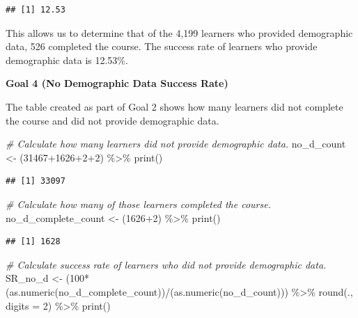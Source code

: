 \documentclass[
]{article}
\newenvironment{Shaded}{\begin{snugshade}}{\end{snugshade}}
\newcommand{\AttributeTok}[1]{\textcolor[rgb]{0.77,0.63,0.00}{#1}}
\newcommand{\CommentTok}[1]{\textcolor[rgb]{0.56,0.35,0.01}{\textit{#1}}}
\newcommand{\DecValTok}[1]{\textcolor[rgb]{0.00,0.00,0.81}{#1}}
\newcommand{\FunctionTok}[1]{\textcolor[rgb]{0.00,0.00,0.00}{#1}}
\newcommand{\NormalTok}[1]{#1}
\newcommand{\OtherTok}[1]{\textcolor[rgb]{0.56,0.35,0.01}{#1}}
\newcommand{\SpecialCharTok}[1]{\textcolor[rgb]{0.00,0.00,0.00}{#1}}
\begin{document}
\begin{verbatim}
## [1] 12.53
\end{verbatim}

This allows us to determine that of the 4,199 learners who provided
demographic data, 526 completed the course. The success rate of learners
who provide demographic data is 12.53\%.

\textbf{Goal 4 (No Demographic Data Success Rate)}

The table created as part of Goal 2 shows how many learners did not
complete the course and did not provide demographic data.

\begin{Shaded}
\begin{Highlighting}[]
\CommentTok{\# Calculate how many learners did not provide demographic data.}
\NormalTok{no\_d\_count }\OtherTok{\textless{}{-}}\NormalTok{ (}\DecValTok{31467}\SpecialCharTok{+}\DecValTok{1626}\SpecialCharTok{+}\DecValTok{2}\SpecialCharTok{+}\DecValTok{2}\NormalTok{) }\SpecialCharTok{\%\textgreater{}\%}
  \FunctionTok{print}\NormalTok{()}
\end{Highlighting}
\end{Shaded}

\begin{verbatim}
## [1] 33097
\end{verbatim}

\begin{Shaded}
\begin{Highlighting}[]
\CommentTok{\# Calculate how many of those learners completed the course.}
\NormalTok{no\_d\_complete\_count }\OtherTok{\textless{}{-}}\NormalTok{ (}\DecValTok{1626}\SpecialCharTok{+}\DecValTok{2}\NormalTok{) }\SpecialCharTok{\%\textgreater{}\%}
  \FunctionTok{print}\NormalTok{()}
\end{Highlighting}
\end{Shaded}

\begin{verbatim}
## [1] 1628
\end{verbatim}

\begin{Shaded}
\begin{Highlighting}[]
\CommentTok{\# Calculate success rate of learners who did not provide demographic data.}
\NormalTok{SR\_no\_d }\OtherTok{\textless{}{-}}\NormalTok{ (}\DecValTok{100}\SpecialCharTok{*}\NormalTok{(}\FunctionTok{as.numeric}\NormalTok{(no\_d\_complete\_count))}\SpecialCharTok{/}\NormalTok{(}\FunctionTok{as.numeric}\NormalTok{(no\_d\_count))) }\SpecialCharTok{\%\textgreater{}\%}
  \FunctionTok{round}\NormalTok{(., }\AttributeTok{digits =} \DecValTok{2}\NormalTok{) }\SpecialCharTok{\%\textgreater{}\%}
  \FunctionTok{print}\NormalTok{()}
\end{Highlighting}
\end{Shaded}
\end{document}
